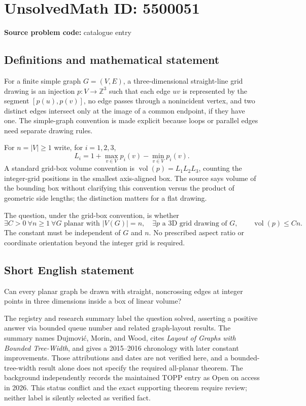 \documentclass[11pt]{article}
\newcommand{\Z}{\mathbb{Z}}
\begin{document}
\section*{UnsolvedMath ID: 5500051}
\textbf{Source problem code:} catalogue entry
\subsection{Definitions and mathematical statement}
For a finite simple graph $G=(V,E)$, a three-dimensional straight-line grid drawing is an injection $p:V\to\Z^3$ such that each edge $uv$ is represented by the segment $[p(u),p(v)]$, no edge passes through a nonincident vertex, and two distinct edges intersect only at the image of a common endpoint, if they have one. The simple-graph convention is made explicit because loops or parallel edges need separate drawing rules.

For $n=|V|\ge1$ write, for $i=1,2,3$,
\[
 L_i=1+\max_{v\in V}p_i(v)-\min_{v\in V}p_i(v).
\]
A standard grid-box volume convention is $\operatorname{vol}(p)=L_1L_2L_3$, counting the integer-grid positions in the smallest axis-aligned box. The source says volume of the bounding box without clarifying this convention versus the product of geometric side lengths; the distinction matters for a flat drawing.

The question, under the grid-box convention, is whether
\[
 \exists C>0\ \forall n\ge1\ \forall G\text{ planar with }|V(G)|=n,
 \quad\exists p\text{ a 3D grid drawing of }G,
 \qquad\operatorname{vol}(p)\le Cn.
\]
The constant must be independent of $G$ and $n$. No prescribed aspect ratio or coordinate orientation beyond the integer grid is required.
\subsection{Short English statement}
Can every planar graph be drawn with straight, noncrossing edges at integer points in three dimensions inside a box of linear volume?

The registry and research summary label the question solved, asserting a positive answer via bounded queue number and related graph-layout results. The summary names Dujmović, Morin, and Wood, cites \emph{Layout of Graphs with Bounded Tree-Width}, and gives a 2015--2016 chronology with later constant improvements. Those attributions and dates are not verified here, and a bounded-tree-width result alone does not specify the required all-planar theorem. The background independently records the maintained TOPP entry as Open on access in 2026. This status conflict and the exact supporting theorem require review; neither label is silently selected as verified fact.
\end{document}

